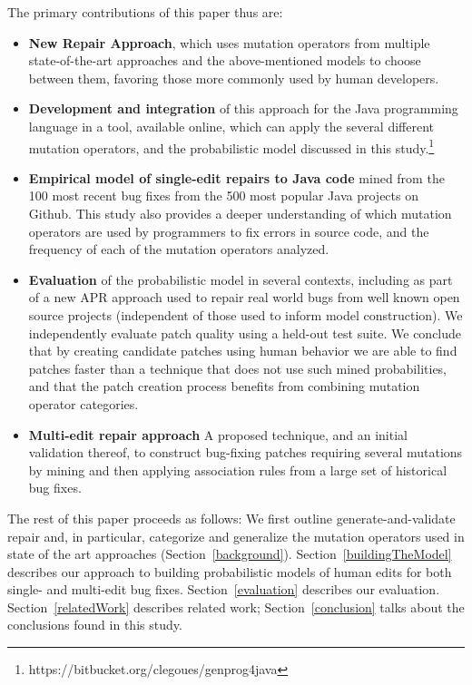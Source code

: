 \documentclass[conference]{IEEEtran}
\begin{document}
The primary contributions of this paper thus are:
\begin{itemize}
	\item \textbf{New Repair Approach}, which uses mutation operators
    from multiple state-of-the-art approaches and
    the above-mentioned models to choose between them, favoring those more commonly
    used by human developers.
    \item \textbf{Development and integration} of this approach for the Java programming language in a tool, available online, which can apply the several different mutation operators, and the probabilistic model discussed in this study.\footnote{https://bitbucket.org/clegoues/genprog4java}
    \item \textbf{Empirical model of single-edit repairs to Java code} mined
      from the 100 most recent bug fixes from the 500 most popular Java projects on
    Github. This study also provides a deeper
    understanding of which mutation operators are used by programmers to fix
    errors in source code, and the frequency of each of the mutation operators
    analyzed. 
  \item \textbf{Evaluation} of the probabilistic model in several
    contexts, including as part of a new APR approach used to repair real world bugs from well
    known open source projects (independent of those used to inform model
    construction). We independently evaluate patch quality using a held-out test
    suite. We conclude that by creating candidate patches using human behavior
    we are able to find patches faster than a technique that does not use such
    mined probabilities, and that the patch creation
    process benefits from combining mutation operator categories.  
  \item \textbf{Multi-edit repair approach} A proposed technique, and an initial
    validation thereof, to construct 
    bug-fixing patches requiring several mutations by mining and then applying association
    rules from a large set of historical bug fixes. 
\end{itemize}

The rest of this paper proceeds as follows: We first outline
generate-and-validate repair and, in particular, 
categorize and generalize the mutation operators used in state of the art
approaches (Section~\ref{background}). Section~\ref{buildingTheModel}
describes our approach to building probabilistic models of human 
edits for both single- and multi-edit bug fixes. Section~\ref{evaluation}
describes our evaluation. Section~\ref{relatedWork} describes
related work; Section~\ref{conclusion} talks about the conclusions found in this study. 
\end{document}
